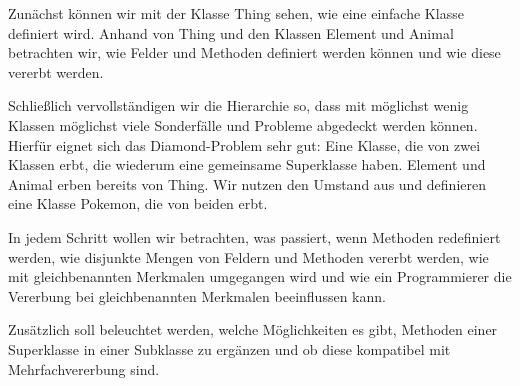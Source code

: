 Zunächst können wir mit der Klasse Thing sehen, wie eine einfache Klasse definiert wird. Anhand von Thing und den Klassen Element und Animal betrachten wir, wie Felder und Methoden definiert werden können und wie diese vererbt werden.

Schließlich vervollständigen wir die Hierarchie so, dass mit möglichst wenig Klassen möglichst viele Sonderfälle und Probleme abgedeckt werden können. Hierfür eignet sich das Diamond-Problem sehr gut: Eine Klasse, die von zwei Klassen erbt, die wiederum eine gemeinsame Superklasse haben. Element und Animal erben bereits von Thing. Wir nutzen den Umstand  aus und definieren eine Klasse Pokemon, die von beiden erbt.

In jedem Schritt wollen wir betrachten, was passiert, wenn Methoden redefiniert werden, wie disjunkte Mengen von Feldern und Methoden vererbt werden, wie mit gleichbenannten Merkmalen umgegangen wird und wie ein Programmierer die Vererbung bei gleichbenannten Merkmalen beeinflussen kann.

Zusätzlich soll beleuchtet werden, welche Möglichkeiten es gibt, Methoden einer Superklasse in einer Subklasse zu ergänzen und ob diese kompatibel mit Mehrfachvererbung sind.